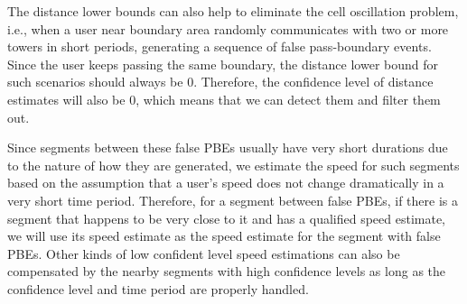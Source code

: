 The distance lower bounds can also help to eliminate the cell oscillation problem, i.e., when a user near boundary area randomly communicates with two or more towers in short periods, generating a sequence of false pass-boundary events. Since the user keeps passing the same boundary, the distance lower bound for such scenarios should always be $0$. Therefore, the confidence level of distance estimates will also be $0$, which means that we can detect them and filter them out.

Since segments between these false PBEs usually have very short durations due to the nature of how they are generated, we estimate the speed for such segments based on the assumption that a user's speed does not change dramatically in a very short time period. Therefore, for a segment between false PBEs, if there is a segment that happens to be very close to it and has a qualified speed estimate,  we will use its speed estimate as the speed estimate for the segment with false PBEs. Other kinds of low confident level speed estimations can also be compensated by the nearby segments with high confidence levels as long as the confidence level and time period are properly handled.

